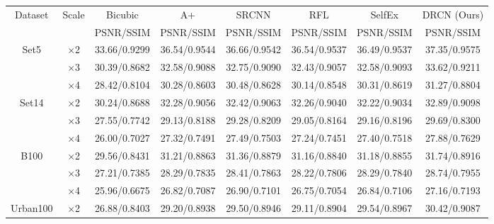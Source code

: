 \documentclass[10pt,twocolumn,letterpaper]{article}
\begin{document}
\begin{table}
\begin{center}
\setlength{\tabcolsep}{2pt}
\footnotesize
\begin{tabular}{ | c | c | c | c | c | c | c | c | }
\hline
\multirow{2}{*}{Dataset} & \multirow{2}{*}{Scale} & Bicubic & A+ & SRCNN & RFL & SelfEx & DRCN (Ours)\\
 & & PSNR/SSIM & PSNR/SSIM & PSNR/SSIM & PSNR/SSIM & PSNR/SSIM & PSNR/SSIM\\
\hline
\hline
\multirow{3}{*}{Set5} & $\times$2 & 33.66/0.9299 & 36.54/{\color{blue}0.9544} & {\color{blue}36.66}/0.9542 & 36.54/0.9537 & 36.49/0.9537 & {\color{red}37.35}/{\color{red}0.9575}\\
 & $\times$3 & 30.39/0.8682 & 32.58/0.9088 & {\color{blue}32.75}/0.9090 & 32.43/0.9057 & 32.58/{\color{blue}0.9093} & {\color{red}33.62}/{\color{red}0.9211}\\
 & $\times$4 & 28.42/0.8104 & 30.28/0.8603 & {\color{blue}30.48}/{\color{blue}0.8628} & 30.14/0.8548 & 30.31/0.8619 & {\color{red}31.27}/{\color{red}0.8804}\\
\hline
\hline
\multirow{3}{*}{Set14} & $\times$2 & 30.24/0.8688 & 32.28/0.9056 & {\color{blue}32.42}/{\color{blue}0.9063} & 32.26/0.9040 & 32.22/0.9034 & {\color{red}32.89}/{\color{red}0.9098}\\
 & $\times$3 & 27.55/0.7742 & 29.13/0.8188 & {\color{blue}29.28}/{\color{blue}0.8209} & 29.05/0.8164 & 29.16/0.8196 & {\color{red}29.69}/{\color{red}0.8300}\\
 & $\times$4 & 26.00/0.7027 & 27.32/0.7491 & {\color{blue}27.49}/0.7503 & 27.24/0.7451 & 27.40/{\color{blue}0.7518} & {\color{red}27.88}/{\color{red}0.7629}\\
\hline
\hline
\multirow{3}{*}{B100} & $\times$2 & 29.56/0.8431 & 31.21/0.8863 & {\color{blue}31.36}/{\color{blue}0.8879} & 31.16/0.8840 & 31.18/0.8855 & {\color{red}31.74}/{\color{red}0.8916}\\
 & $\times$3 & 27.21/0.7385 & 28.29/0.7835 & {\color{blue}28.41}/{\color{blue}0.7863} & 28.22/0.7806 & 28.29/0.7840 & {\color{red}28.74}/{\color{red}0.7955}\\
 & $\times$4 & 25.96/0.6675 & 26.82/0.7087 & {\color{blue}26.90}/0.7101 & 26.75/0.7054 & 26.84/{\color{blue}0.7106} & {\color{red}27.16}/{\color{red}0.7193}\\
\hline
\hline
\multirow{3}{*}{Urban100} & $\times$2 & 26.88/0.8403 & 29.20/0.8938 & 29.50/0.8946 & 29.11/0.8904 & {\color{blue}29.54}/{\color{blue}0.8967} & {\color{red}30.42}/{\color{red}0.9087}\\

\end{tabular}
\end{center}
\end{table}
\end{document}
